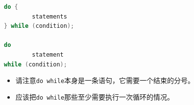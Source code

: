 \begin{frame}[fragile]\ft{\secname}
\begin{lstlisting}[language=c,frame=single]
do {
        statements
} while (condition);

do 
        statement 
while (condition);
\end{lstlisting}

\end{frame}

\begin{frame}[fragile]\ft{\secname}

\begin{itemize}
\item
请注意\lstinline|do while|本身是一条语句，它需要一个结束的分号。\\[0.1in]
\item
应该把\lstinline|do while|那些至少需要执行一次循环的情况。
\end{itemize}
\end{frame}



 
